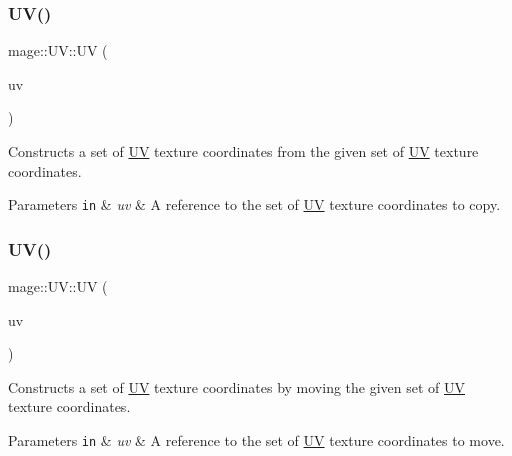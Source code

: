 \subsubsection{\texorpdfstring{U\+V()}{UV()}\hspace{0.1cm}{\footnotesize\ttfamily [3/6]}}
{\footnotesize\ttfamily mage\+::\+U\+V\+::\+UV (\begin{DoxyParamCaption}\item[{const \hyperlink{structmage_1_1_u_v}{UV} \&}]{uv }\end{DoxyParamCaption})}

Constructs a set of \hyperlink{structmage_1_1_u_v}{UV} texture coordinates from the given set of \hyperlink{structmage_1_1_u_v}{UV} texture coordinates.


\begin{DoxyParams}[1]{Parameters}
\mbox{\tt in}  & {\em uv} & A reference to the set of \hyperlink{structmage_1_1_u_v}{UV} texture coordinates to copy. \\
\hline
\end{DoxyParams}
\hypertarget{structmage_1_1_u_v_ac26053e28b94c8ec7e5bc5df8b52d4eb}{}\label{structmage_1_1_u_v_ac26053e28b94c8ec7e5bc5df8b52d4eb} 
\subsubsection{\texorpdfstring{U\+V()}{UV()}\hspace{0.1cm}{\footnotesize\ttfamily [4/6]}}
{\footnotesize\ttfamily mage\+::\+U\+V\+::\+UV (\begin{DoxyParamCaption}\item[{\hyperlink{structmage_1_1_u_v}{UV} \&\&}]{uv }\end{DoxyParamCaption})}

Constructs a set of \hyperlink{structmage_1_1_u_v}{UV} texture coordinates by moving the given set of \hyperlink{structmage_1_1_u_v}{UV} texture coordinates.


\begin{DoxyParams}[1]{Parameters}
\mbox{\tt in}  & {\em uv} & A reference to the set of \hyperlink{structmage_1_1_u_v}{UV} texture coordinates to move. \\
\hline
\end{DoxyParams}
\hypertarget{structmage_1_1_u_v_af81045f21f3d8c6bc684df7215631762}{}\label{structmage_1_1_u_v_af81045f21f3d8c6bc684df7215631762} 
